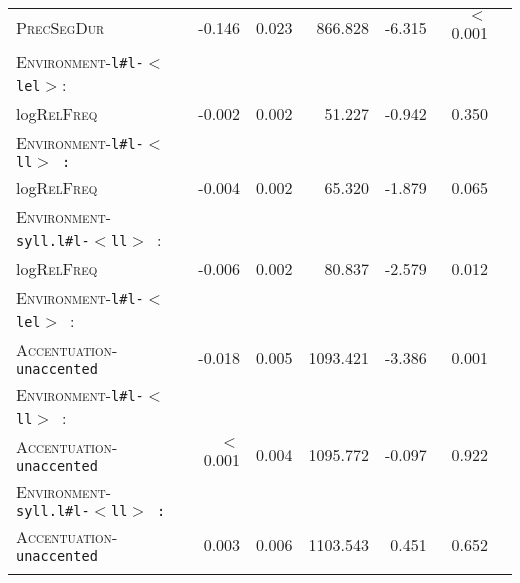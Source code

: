 \begin{table}
{\begin{tabular} {lrrrrrr}
		\textsc{PrecSegDur} & -0.146 & 0.023 & 866.828 & -6.315 & $<$0.001  \\ 
		
		\textsc{Environment}-\texttt{l\#l-$<$lel$>$}: &&&&&\\
		log\textsc{RelFreq }& \color{lsLightGray}-0.002 &\color{lsLightGray} 0.002 & \color{lsLightGray}51.227 &\color{lsLightGray} -0.942 & \color{lsLightGray}0.350 \\ 
		
		\textsc{Environment}-\texttt{l\#l-$<$ll$>$ :}  &&&&&\\
		log\textsc{RelFreq }&\color{lsLightGray} -0.004 & \color{lsLightGray}0.002 &\color{lsLightGray} 65.320 & \color{lsLightGray}-1.879 &\color{lsLightGray} 0.065 \\ 
		
		\textsc{Environment}-\texttt{syll.l\#l-$<$ll$>$ }: &&&&&\\
		log\textsc{RelFreq }& -0.006 & 0.002 & 80.837 & -2.579 & 0.012 \\ 
		
		\textsc{Environment}-\texttt{l\#l-$<$lel$>$ }: &&&&&\\
		\textsc{Accentuation}-\texttt{unaccented} & -0.018 & 0.005 & 1093.421 & -3.386 & 0.001 \\ 
		
		\textsc{Environment}-\texttt{l\#l-$<$ll$>$ }: &&&&&\\
		\textsc{Accentuation}-\texttt{unaccented} & \color{lsLightGray}$<$0.001&\color{lsLightGray} 0.004 &\color{lsLightGray} 1095.772 & \color{lsLightGray}-0.097 & \color{lsLightGray}0.922 \\ 
		
		\textsc{Environment}-\texttt{syll.l\#l-$<$ll$>$ :} &&&&&\\
		\textsc{Accentuation}-\texttt{unaccented} &\color{lsLightGray} 0.003 & \color{lsLightGray}0.006 &\color{lsLightGray} 1103.543 & \color{lsLightGray}0.451 &\color{lsLightGray} 0.652 \\ 
	\lspbottomrule 
			\end{tabular}
}


\end{table}




